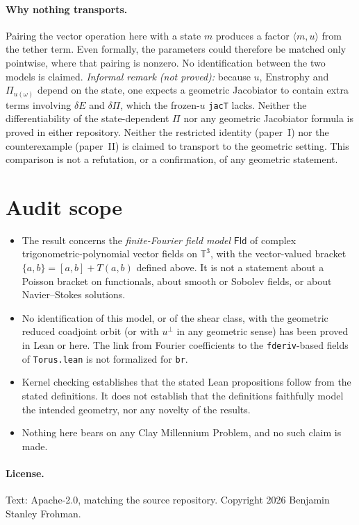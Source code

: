 \documentclass[11pt]{article}\emergencystretch=2em
\theoremstyle{definition}\newtheorem{definition}[theorem]{Definition}\theoremstyle{remark}\newtheorem{remark}[theorem]{Remark}
\newcommand{\Fld}{\mathsf{Fld}}\newcommand{\br}[2]{[#1,#2]}\newcommand{\pr}[2]{\langle #1,#2\rangle}
\begin{document}
\paragraph{Why nothing transports.} Pairing the vector operation here with a state $m$ produces a factor $\langle m,u\rangle$ from the tether term. Even formally, the parameters could therefore be matched only pointwise, where that pairing is nonzero. No identification between the two models is claimed.
\emph{Informal remark (not proved):} because $u$, $\mathrm{Enstrophy}$ and $\Pi_{u(\omega)}$ depend on the state, one expects a geometric Jacobiator to contain extra terms involving $\delta E$ and $\delta\Pi$, which the frozen-$u$ \texttt{jacT} lacks. Neither the differentiability of the state-dependent $\Pi$ nor any geometric Jacobiator formula is proved in either repository. Neither the restricted identity (paper~I) nor the counterexample (paper~II) is claimed to transport to the geometric setting. This comparison is not a refutation, or a confirmation, of any geometric statement.

\section{Audit scope}
\begin{itemize}
\item The result concerns the \emph{finite-Fourier field model} $\Fld$ of complex trigonometric-polynomial vector fields on $\mathbb T^3$, with the vector-valued bracket $\{a,b\}=\br ab+T(a,b)$ defined above. It is not a statement about a Poisson bracket on functionals, about smooth or Sobolev fields, or about Navier--Stokes solutions.
\item No identification of this model, or of the shear class, with the geometric reduced coadjoint orbit (or with $u^\perp$ in any geometric sense) has been proved in Lean or here. The link from Fourier coefficients to the \texttt{fderiv}-based fields of \texttt{Torus.lean} is not formalized for \texttt{br}.
\item Kernel checking establishes that the stated Lean propositions follow from the stated definitions. It does not establish that the definitions faithfully model the intended geometry, nor any novelty of the results.
\item Nothing here bears on any Clay Millennium Problem, and no such claim is made.
\end{itemize}
\paragraph{License.} Text: Apache-2.0, matching the source repository. Copyright 2026 Benjamin Stanley Frohman.
\end{document}
